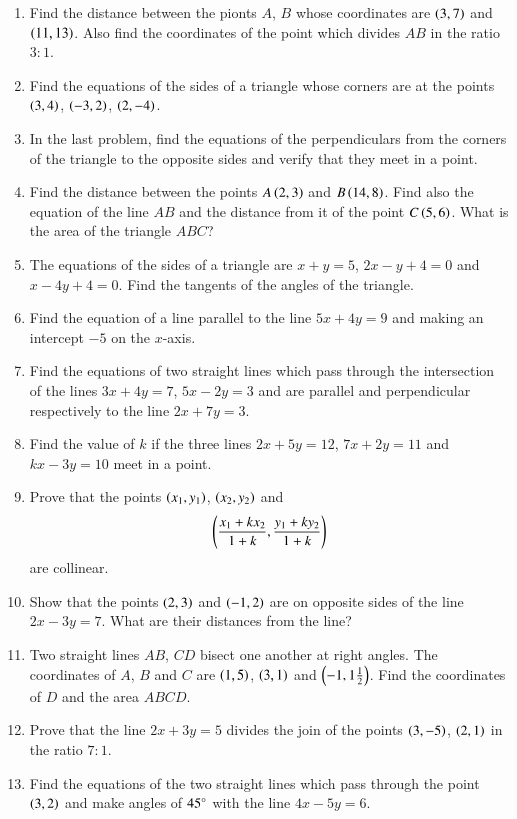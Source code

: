 \begin{enumerate}[1.]
\item Find the distance between the pionts $A$, $B$ whose coordinates are $\left(3,7\right)$ and $\left(11,13\right)$.  Also
find the coordinates of the point which divides $AB$ in the ratio $3:1$.
\item Find the equations of the sides of a triangle whose corners are at the points
$\left(3,4\right)$, $\left(-3,2\right)$, $\left(2,-4\right)$.
\item In the last problem, find the equations of the perpendiculars from the corners of the triangle
to the opposite sides and verify that they meet in a point.
\item Find the distance between the points $A \left(2,3\right)$ and $B \left(14,8\right)$.  Find also the equation of the line $AB$ and
the distance from it of the point $C \left(5,6\right)$.  What is the area of the triangle $ABC$?
\item The equations of the sides of a triangle are $x+y=5$, $2x-y+4=0$ and $x-4y+4=0$.  Find the tangents of the angles of
the triangle.
\item Find the equation of a line parallel to the line $5x+4y=9$ and making an intercept $-5$ 
on the $x$-axis.
\item Find the equations of two straight lines which pass through the intersection
of the lines $3x+4y=7$, $5x-2y=3$ and are parallel and perpendicular respectively to the line $2x+7y=3$.
\item Find the value of $k$ if the three lines $2x+5y=12$, $7x+2y=11$ and $kx-3y=10$ meet in a point.
\item Prove that the points $\left(x_1,y_1\right)$, $\left(x_2,y_2\right)$ and
\begin{align*}
\left(\frac{x_1+kx_2}{1+k},\frac{y_1+ky_2}{1+k}\right)
\end{align*}
are collinear.
\item Show that the points $\left(2,3\right)$ and $\left(-1,2\right)$ are on opposite sides of the line $2x-3y=7$.  What are their distances from the line?
\item Two straight lines $AB$, $CD$ bisect one another at right angles.  The coordinates of $A$, $B$ and $C$ are
$\left(1,5\right)$, $\left(3,1\right)$ and $\left(-1,1\frac{1}{2}\right)$.  Find the coordinates of $D$ and the area $ABCD$.
\item Prove that the line $2x+3y=5$ divides the join of the points $\left(3,-5\right)$, $\left(2,1\right)$ in the ratio $7:1$.
\item Find the equations of the two straight lines which pass through the point $\left(3,2\right)$ and make angles of $45\degree$ with the line $4x-5y=6$.

\end{enumerate}
